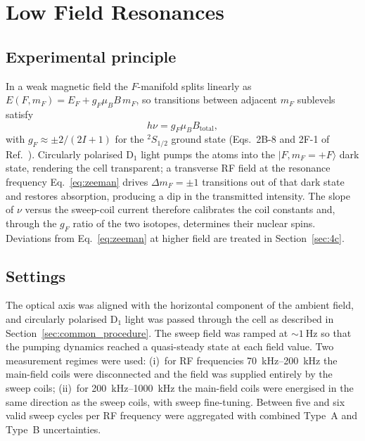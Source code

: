 \section{Low Field Resonances}\label{sec:4b}

\subsection{Experimental principle}
In a weak magnetic field the $F$-manifold splits linearly as
$E(F,m_F) = E_F + g_F \mu_B B\,m_F$, so transitions between adjacent
$m_F$ sublevels satisfy
\begin{equation}
  h\nu = g_F \mu_B B_{\mathrm{total}},
  \label{eq:zeeman}
\end{equation}
with $g_F \approx \pm 2/(2I+1)$ for the $^2S_{1/2}$ ground state (Eqs.~2B-8
and 2F-1 of Ref.~\cite{OpticalPumpingRubidium2002}). Circularly polarised
D$_1$ light pumps the atoms into the $|F,m_F=+F\rangle$ dark state,
rendering the cell transparent; a transverse RF field at the resonance
frequency Eq.~\ref{eq:zeeman} drives $\Delta m_F = \pm 1$ transitions out of
that dark state and restores absorption, producing a dip in the transmitted
intensity. The slope of $\nu$ versus the sweep-coil current therefore
calibrates the coil constants and, through the $g_F$ ratio of the two
isotopes, determines their nuclear spins. Deviations from
Eq.~\ref{eq:zeeman} at higher field are treated in Section~\ref{sec:4c}.

\subsection{Settings}
The optical axis was aligned with the horizontal component of the ambient
field, and circularly polarised D$_1$ light was passed through the cell as
described in Section~\ref{sec:common_procedure}. The sweep field was ramped
at ${\sim}\SI{1}{\hertz}$ so that the pumping dynamics reached a
quasi-steady state at each field value. Two measurement regimes were used:
(i)~for RF frequencies \SIrange{70}{200}{\kilo\hertz} the main-field coils
were disconnected and the field was supplied entirely by the sweep coils;
(ii)~for \SIrange{200}{1000}{\kilo\hertz} the main-field coils were
energised in the same direction as the sweep coils, with sweep fine-tuning.
Between five and six valid sweep cycles per RF frequency were aggregated
with combined Type~A and Type~B uncertainties.

